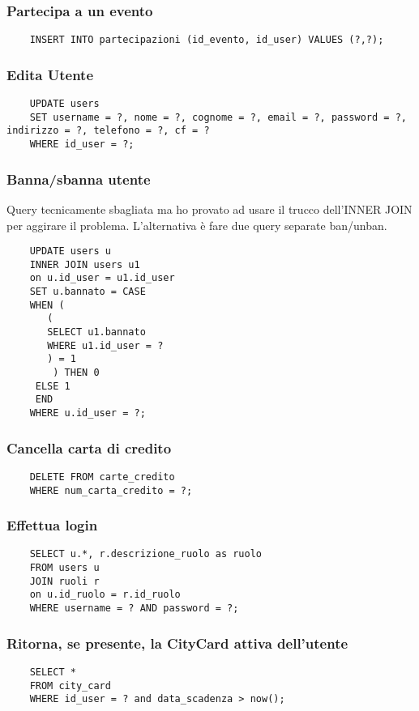 \subsubsection{Partecipa a un evento}
\begin{lstlisting}
    INSERT INTO partecipazioni (id_evento, id_user) VALUES (?,?);
\end{lstlisting}

\subsubsection{Edita Utente}
\begin{lstlisting}
    UPDATE users 
    SET username = ?, nome = ?, cognome = ?, email = ?, password = ?, indirizzo = ?, telefono = ?, cf = ? 
    WHERE id_user = ?;
\end{lstlisting}

\subsubsection{Banna/sbanna utente}
Query tecnicamente sbagliata ma ho provato ad usare il trucco dell'INNER JOIN per aggirare il problema. L'alternativa è fare due query separate ban/unban.
\begin{lstlisting}
    UPDATE users u
    INNER JOIN users u1 
    on u.id_user = u1.id_user
    SET u.bannato = CASE
    WHEN (
       (
       SELECT u1.bannato
       WHERE u1.id_user = ?
       ) = 1
        ) THEN 0
     ELSE 1
     END
    WHERE u.id_user = ?;
\end{lstlisting}

\subsubsection{Cancella carta di credito}
\begin{lstlisting}
    DELETE FROM carte_credito
    WHERE num_carta_credito = ?;
\end{lstlisting}

\subsubsection{Effettua login}
\begin{lstlisting}
    SELECT u.*, r.descrizione_ruolo as ruolo
    FROM users u
    JOIN ruoli r 
    on u.id_ruolo = r.id_ruolo
    WHERE username = ? AND password = ?;
\end{lstlisting}

\subsubsection{Ritorna, se presente, la CityCard attiva dell'utente}
\begin{lstlisting}
    SELECT *
    FROM city_card
    WHERE id_user = ? and data_scadenza > now();
\end{lstlisting}

